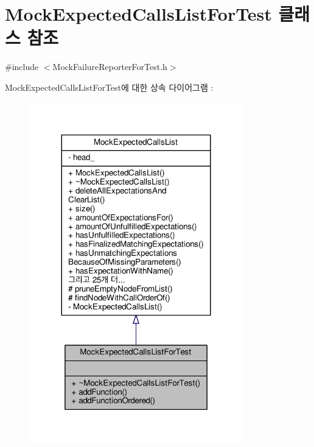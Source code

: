 \hypertarget{class_mock_expected_calls_list_for_test}{}\section{Mock\+Expected\+Calls\+List\+For\+Test 클래스 참조}
\label{class_mock_expected_calls_list_for_test}


{\ttfamily \#include $<$Mock\+Failure\+Reporter\+For\+Test.\+h$>$}



Mock\+Expected\+Calls\+List\+For\+Test에 대한 상속 다이어그램 \+: 
\nopagebreak
\begin{figure}[H]
\begin{center}
\leavevmode
\includegraphics[width=263pt]{class_mock_expected_calls_list_for_test__inherit__graph}
\end{center}
\end{figure}


